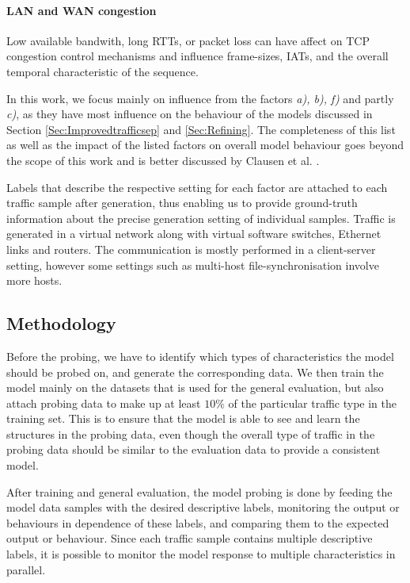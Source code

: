 \documentclass[10pt,conference]{IEEEtran}
\begin{document}
\paragraph{LAN and WAN congestion}
Low available bandwith, long RTTs, or packet loss can have affect on TCP congestion control mechanisms and influence frame-sizes, IATs, and the overall temporal characteristic of the sequence.

\vspace{0.2cm}

In this work, we focus mainly on influence from the factors \textit{a), b), f)} and partly \textit{c)}, as they have most influence on the behaviour of the models discussed in Section \ref{Sec:Improvedtrafficsep} and \ref{Sec:Refining}. The completeness of this list as well as the impact of the listed factors on overall model behaviour goes beyond the scope of this work and is better discussed by Clausen et al. \cite{clausen2021Controlling}.


Labels that describe the respective setting for each factor are attached to each traffic sample after generation, thus enabling us to provide ground-truth information about the precise generation setting of individual samples. Traffic is generated in a virtual network along with virtual software switches, Ethernet links and routers. The communication is mostly performed in a client-server setting, however some settings such as multi-host file-synchronisation involve more hosts. 


\subsection{Methodology}

Before the probing, we have to identify which types of characteristics the model should be probed on, and generate the corresponding data. We then train the model mainly on the datasets that is used for the general evaluation, but also attach probing data to make up at least $10\%$ of the particular traffic type in the training set. This is to ensure that the model is able to see and learn the structures in the probing data, even though the overall type of traffic in the probing data should be similar to the evaluation data to provide a consistent model.

After training and general evaluation, the model probing is done by feeding the model data samples with the desired descriptive labels, monitoring the output or behaviours in dependence of these labels, and comparing them to the expected output or behaviour. Since each traffic sample contains multiple descriptive labels, it is possible to monitor the model response to multiple characteristics in parallel.
\end{document}
